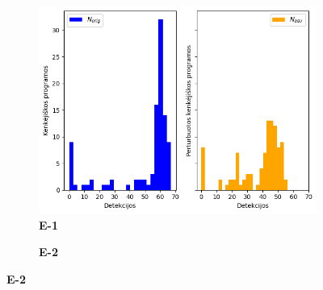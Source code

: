 
\label{app:experiment}
\begin{figure}[h]
    \begin{small}
        \begin{center}
            \begin{subfigure}[t]{0.48\textwidth}
                \centering
                \caption{\textbf{E-1}}
                \includegraphics[width=\textwidth]{img/det_distributions_paper.png}
            \end{subfigure}
            \hfill
            \begin{subfigure}[t]{0.48\textwidth}
                \centering
                \caption{\textbf{E-2}}

\end{subfigure}
\end{center}
\end{small}
\end{figure}
